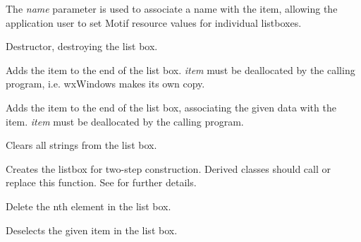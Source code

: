 The {\it name} parameter is used to associate a name with the item,
allowing the application user to set Motif resource values for
individual listboxes.



Destructor, destroying the list box.



Adds the item to the end of the list box. {\it item} must be deallocated by the calling
program, i.e. wxWindows makes its own copy.


Adds the item to the end of the list box, associating the given data
with the item. {\it item} must be deallocated by the calling program.



Clears all strings from the list box.



Creates the listbox for two-step construction. Derived classes
should call or replace this function. See \rtfsp
for further details.



Delete the nth element in the list box.



Deselects the given item in the list box.



